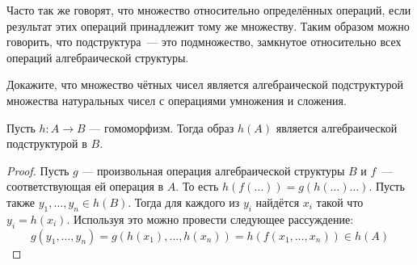 Часто так же говорят, что множество  относительно определённых операций, если результат этих операций принадлежит тому же множеству. Таким образом можно говорить, что подструктура~--- это подмножество, замкнутое относительно всех операций алгебраической структуры.

\begin{exercise}
	Докажите, что множество чётных чисел является алгебраической подструктурой множества натуральных чисел с операциями умножения и сложения.
\end{exercise}

\begin{thm}
	Пусть $h:A\to B$ --- гомоморфизм. Тогда образ $h(A)$ является алгебраической подструктурой в $B$.
\end{thm}
\begin{proof}
	Пусть $g$ --- произвольная операция алгебраической структуры $B$ и $f$~--- соответствующая ей операция в $A$. То есть $h(f(\ldots))=g(h(\ldots)\ldots)$. Пусть также $y_1,\ldots,y_n\in h(B)$. Тогда для каждого из $y_i$ найдётся $x_i$ такой что $y_i=h(x_i)$. Используя это можно провести следующее рассуждение:
	\[
	g(y_1,\ldots,y_n) = g(h(x_1),\ldots,h(x_n)) = h(f(x_1,\ldots,x_n)) \in h(A)
	\]
\end{proof}
